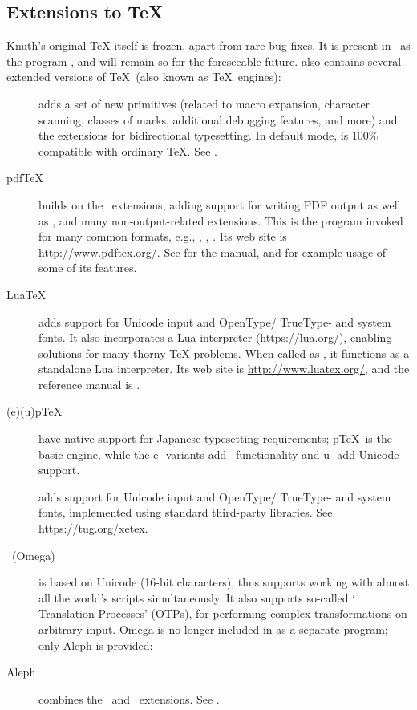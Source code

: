\documentclass{article}
\begin{document}
\subsection{Extensions to \protect\TeX}
\label{sec:tex-extensions}

Knuth's original \TeX{} itself is frozen, apart from rare bug fixes. It
is present in \TL\ as the program , and will remain so
for the foreseeable future.  \TL{} also contains several extended versions of
\TeX\ (also known as \TeX\ engines):

\begin{description}

\item [\eTeX] adds a set of new primitives
\label{text:etex} (related to macro expansion, character scanning,
classes of marks, additional debugging features, and more) and the
\TeXXeT{} extensions for bidirectional typesetting.  In default mode,
\eTeX{} is 100\% compatible with ordinary \TeX. See
.

\item [pdf\TeX] builds on the \eTeX\ extensions, adding support for
writing PDF output as well as \dvi{}, and many non-output-related
extensions.  This is the program invoked for many common formats, e.g.,
, , .  Its web site is
\url{http://www.pdftex.org/}.  See
 for the manual, and
 for example
usage of some of its features.

\item [Lua\TeX] adds support for Unicode input and OpenType\slash
TrueType- and system fonts. It also incorporates a Lua interpreter
(\url{https://lua.org/}), enabling solutions for many thorny \TeX{}
problems. When called as , it functions as a standalone
Lua interpreter. Its web site is \url{http://www.luatex.org/}, and the
reference manual is .

\item [(e)(u)p\TeX] have native support for Japanese typesetting
requirements; p\TeX\ is the basic engine, while the e- variants add
\eTeX\ functionality and u- add Unicode support.

\item [\XeTeX] adds support for Unicode input and OpenType\slash
TrueType- and system fonts, implemented using standard third-party
libraries. See \url{https://tug.org/xetex}.

\item [\OMEGA\ (Omega)] is based on Unicode (16-bit characters), thus
supports working with almost all the world's scripts simultaneously. It
also supports so-called `\OMEGA{} Translation Processes' (OTPs),
for performing complex transformations on arbitrary input.  Omega is no
longer included in \TL{} as a separate program; only Aleph is provided:

\item [Aleph] combines the \OMEGA\ and \eTeX\ extensions.
See .

\end{description}
\end{document}
